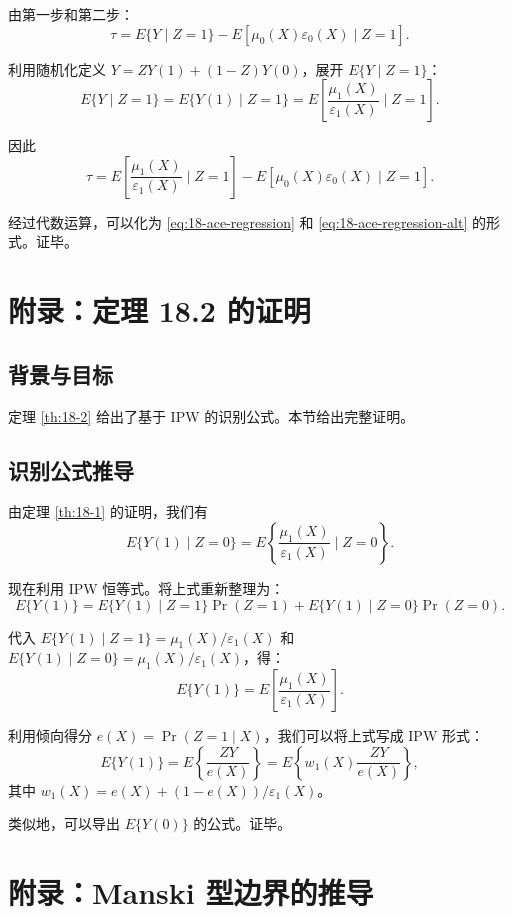 由第一步和第二步：
\[
\tau = E\{Y \mid Z=1\} - E\left[\mu_0(X)\varepsilon_0(X) \mid Z=1\right] .
\]

利用随机化定义 $Y = ZY(1) + (1-Z)Y(0)$，展开 $E\{Y \mid Z=1\}$：
\[
E\{Y \mid Z=1\} = E\{Y(1) \mid Z=1\} = E\left[\frac{\mu_1(X)}{\varepsilon_1(X)} \mid Z=1\right] .
\]

因此
\[
\tau = E\left[\frac{\mu_1(X)}{\varepsilon_1(X)} \mid Z=1\right] - E\left[\mu_0(X)\varepsilon_0(X) \mid Z=1\right] .
\]

经过代数运算，可以化为 \cref{eq:18-ace-regression} 和 \cref{eq:18-ace-regression-alt} 的形式。证毕。

\chapter{附录：定理 18.2 的证明}\label{sec:appendix-18-theorem-2}

\section{背景与目标}\label{sec:appendix-18-th2-bg}

定理 \ref{th:18-2} 给出了基于 IPW 的识别公式。本节给出完整证明。

\section{识别公式推导}\label{sec:appendix-18-th2-derivation}

由定理 \ref{th:18-1} 的证明，我们有
\[
E\{Y(1) \mid Z=0\} = E\left\{\frac{\mu_1(X)}{\varepsilon_1(X)} \mid Z=0\right\} .
\]

现在利用 IPW 恒等式。将上式重新整理为：
\[
E\{Y(1)\} = E\{Y(1) \mid Z=1\}\Pr(Z=1) + E\{Y(1) \mid Z=0\}\Pr(Z=0) .
\]

代入 $E\{Y(1) \mid Z=1\} = \mu_1(X) / \varepsilon_1(X)$ 和 $E\{Y(1) \mid Z=0\} = \mu_1(X) / \varepsilon_1(X)$，得：
\[
E\{Y(1)\} = E\left[\frac{\mu_1(X)}{\varepsilon_1(X)}\right] .
\]

利用倾向得分 $e(X) = \Pr(Z=1 \mid X)$，我们可以将上式写成 IPW 形式：
\[
E\{Y(1)\} = E\left\{\frac{ZY}{e(X)}\right\} = E\left\{w_1(X)\frac{ZY}{e(X)}\right\} ,
\]
其中 $w_1(X) = e(X) + (1-e(X))/\varepsilon_1(X)$。

类似地，可以导出 $E\{Y(0)\}$ 的公式。证毕。

\chapter{附录：Manski 型边界的推导}\label{sec:appendix-18-manski-bounds}


